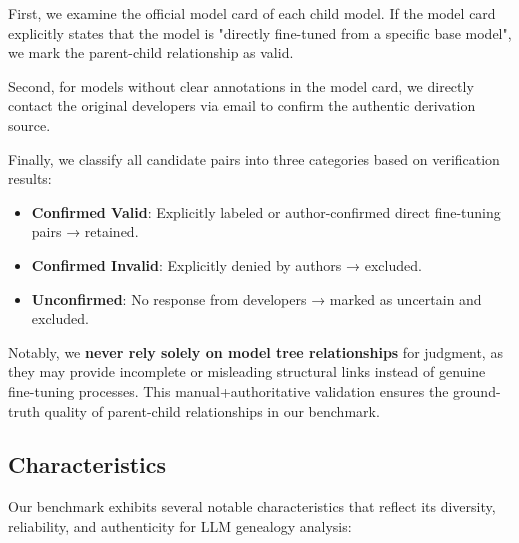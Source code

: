 First, we examine the official model card of each child model. If the model card explicitly states that the model is "directly fine-tuned from a specific base model", we mark the parent-child relationship as valid.

Second, for models without clear annotations in the model card, we directly contact the original developers via email to confirm the authentic derivation source.

Finally, we classify all candidate pairs into three categories based on verification results:
\begin{itemize}
    \item \textbf{Confirmed Valid}: Explicitly labeled or author-confirmed direct fine-tuning pairs → retained.
    \item \textbf{Confirmed Invalid}: Explicitly denied by authors → excluded.
    \item \textbf{Unconfirmed}: No response from developers → marked as uncertain and excluded.
\end{itemize}

Notably, we \textbf{never rely solely on model tree relationships} for judgment, as they may provide incomplete or misleading structural links instead of genuine fine-tuning processes. This manual+authoritative validation ensures the ground-truth quality of parent-child relationships in our benchmark.

\subsection{Characteristics}

Our benchmark exhibits several notable characteristics that reflect its diversity, reliability, and authenticity for LLM genealogy analysis:

